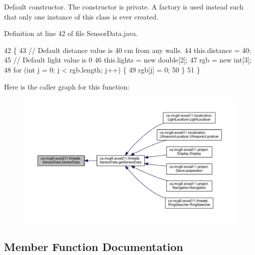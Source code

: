 Default constructor. The constructor is private. A factory is used instead such that only one instance of this class is ever created. 

Definition at line 42 of file Sensor\+Data.\+java.


\begin{DoxyCode}
42                          \{
43     \textcolor{comment}{// Default distance value is 40 cm from any walls.}
44     this.distance = 40;
45     \textcolor{comment}{// Default light value is 0}
46     this.lights = \textcolor{keyword}{new} \textcolor{keywordtype}{double}[2];
47     rgb = \textcolor{keyword}{new} \textcolor{keywordtype}{int}[3];
48     \textcolor{keywordflow}{for} (\textcolor{keywordtype}{int} j = 0; j < rgb.length; j++) \{
49       rgb[j] = 0;
50     \}
51   \}
\end{DoxyCode}
Here is the caller graph for this function\+:
\nopagebreak
\begin{figure}[H]
\begin{center}
\leavevmode
\includegraphics[width=350pt]{classca_1_1mcgill_1_1ecse211_1_1threads_1_1_sensor_data_a11dcdc9c15184e05a9c84fc3958e26b6_icgraph}
\end{center}
\end{figure}


\subsection{Member Function Documentation}
\mbox{\label{classca_1_1mcgill_1_1ecse211_1_1threads_1_1_sensor_data_acc8f6cc56f39c8ea6b812cd8b135eca6}} 
